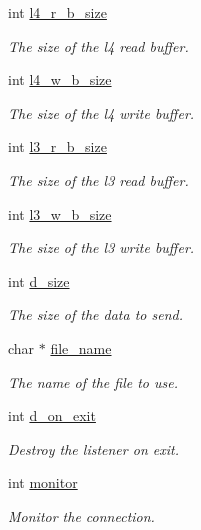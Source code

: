 \begin{DoxyCompactItemize}
int \hyperlink{structtb__test__params__t_a8ae9ae9a85fbb77bc460b0d43e4fc1c5}{l4\-\_\-r\-\_\-b\-\_\-size}
\begin{DoxyCompactList}\small\item\em The size of the l4 read buffer. \end{DoxyCompactList}\item 
int \hyperlink{structtb__test__params__t_a97320ff488c6ed44b28b034c826482c7}{l4\-\_\-w\-\_\-b\-\_\-size}
\begin{DoxyCompactList}\small\item\em The size of the l4 write buffer. \end{DoxyCompactList}\item 
int \hyperlink{structtb__test__params__t_aa9d1ab0c9c6ef33a4b6bd60172dd0ec5}{l3\-\_\-r\-\_\-b\-\_\-size}
\begin{DoxyCompactList}\small\item\em The size of the l3 read buffer. \end{DoxyCompactList}\item 
int \hyperlink{structtb__test__params__t_aee0e87ac541b0694deb1499aa3371f91}{l3\-\_\-w\-\_\-b\-\_\-size}
\begin{DoxyCompactList}\small\item\em The size of the l3 write buffer. \end{DoxyCompactList}\item 
int \hyperlink{structtb__test__params__t_a848d9c2765e62bac90bee8355062858a}{d\-\_\-size}
\begin{DoxyCompactList}\small\item\em The size of the data to send. \end{DoxyCompactList}\item 
char $\ast$ \hyperlink{structtb__test__params__t_a8505c513bc640d1f69e5f76fb32b24a8}{file\-\_\-name}
\begin{DoxyCompactList}\small\item\em The name of the file to use. \end{DoxyCompactList}\item 
int \hyperlink{structtb__test__params__t_a093a636a4cc3aec4f564b9ab29081b59}{d\-\_\-on\-\_\-exit}
\begin{DoxyCompactList}\small\item\em Destroy the listener on exit. \end{DoxyCompactList}\item 
int \hyperlink{structtb__test__params__t_a46fa1969de5714507943035793d36269}{monitor}
\begin{DoxyCompactList}\small\item\em Monitor the connection. \end{DoxyCompactList}\item 

\end{DoxyCompactItemize}
